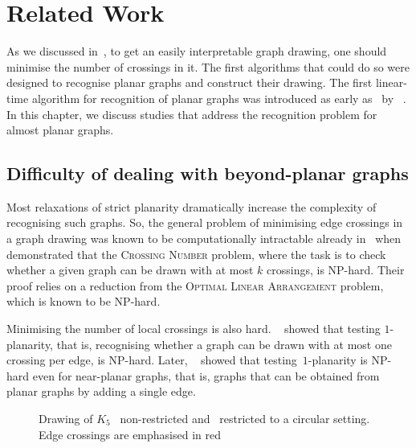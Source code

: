 \chapter{Related Work}\label{ch:related-work}

As we discussed in~, to get an easily interpretable graph drawing, one should minimise the number of crossings in it. The first algorithms that could do so were designed to recognise planar graphs and construct their drawing. The first linear-time algorithm for recognition of planar graphs was introduced as early as~\citeyear{linear-p} by \citeauthor{linear-p}~\cite{linear-p}. In this chapter, we discuss studies that address the recognition problem for almost planar graphs.

\section{Difficulty of dealing with beyond-planar graphs}

Most relaxations of strict planarity dramatically increase the complexity of recognising such graphs. So, the general problem of minimising edge crossings in a graph drawing was known to be computationally intractable already in~\citeyear{cr_NPC} when \citeauthor{cr_NPC}~\cite{cr_NPC} demonstrated that the \textsc{Crossing Number} problem, where the task is to check whether a given graph can be drawn with at most \(k\) crossings, is NP-hard. Their proof relies on a reduction from the \textsc{Optimal Linear Arrangement} problem, which is known to be NP-hard.

Minimising the number of local crossings is also hard. \citeauthor{1p-NPH}~\cite{1p-NPH} showed that testing \(1\)-planarity, that is, recognising whether a graph can be drawn with at most one crossing per edge, is NP-hard. Later, \citeauthor{one-edge-NPH}~\cite{one-edge-NPH} showed that testing~\(1\)-planarity is NP-hard even for near-planar graphs, that is, graphs that can be obtained from planar graphs by adding a single edge.

\begin{figure}[tbh]
    \centering
    \captionsetup{subrefformat=parens}
    \caption{Drawing of \(K_5\) ~non-restricted and ~restricted to a circular setting. Edge crossings are emphasised in red}
    \label{fig:figure}
\end{figure}

